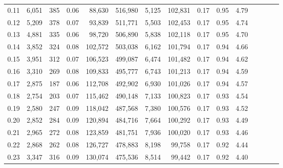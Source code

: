 \begin{tabular}{rrrcrrrrrrrrrrr}
0.11 &   6,051 &    385 &                                       0.06 &   88,630 &  516,980 &    5,125 &  102,831 &  0.17 &  0.95 &                         4.79 \\
0.12 &   5,209 &    378 &                                       0.07 &   93,839 &  511,771 &    5,503 &  102,453 &  0.17 &  0.95 &                         4.74 \\
0.13 &   4,881 &    335 &                                       0.06 &   98,720 &  506,890 &    5,838 &  102,118 &  0.17 &  0.95 &                         4.70 \\
0.14 &   3,852 &    324 &                                       0.08 &  102,572 &  503,038 &    6,162 &  101,794 &  0.17 &  0.94 &                         4.66 \\
0.15 &   3,951 &    312 &                                       0.07 &  106,523 &  499,087 &    6,474 &  101,482 &  0.17 &  0.94 &                         4.62 \\
0.16 &   3,310 &    269 &                                       0.08 &  109,833 &  495,777 &    6,743 &  101,213 &  0.17 &  0.94 &                         4.59 \\
0.17 &   2,875 &    187 &                                       0.06 &  112,708 &  492,902 &    6,930 &  101,026 &  0.17 &  0.94 &                         4.57 \\
0.18 &   2,754 &    203 &                                       0.07 &  115,462 &  490,148 &    7,133 &  100,823 &  0.17 &  0.93 &                         4.54 \\
0.19 &   2,580 &    247 &                                       0.09 &  118,042 &  487,568 &    7,380 &  100,576 &  0.17 &  0.93 &                         4.52 \\
0.20 &   2,852 &    284 &                                       0.09 &  120,894 &  484,716 &    7,664 &  100,292 &  0.17 &  0.93 &                         4.49 \\
0.21 &   2,965 &    272 &                                       0.08 &  123,859 &  481,751 &    7,936 &  100,020 &  0.17 &  0.93 &                         4.46 \\
0.22 &   2,868 &    262 &                                       0.08 &  126,727 &  478,883 &    8,198 &   99,758 &  0.17 &  0.92 &                         4.44 \\
0.23 &   3,347 &    316 &                                       0.09 &  130,074 &  475,536 &    8,514 &   99,442 &  0.17 &  0.92 &                         4.40 \\

\end{tabular}

